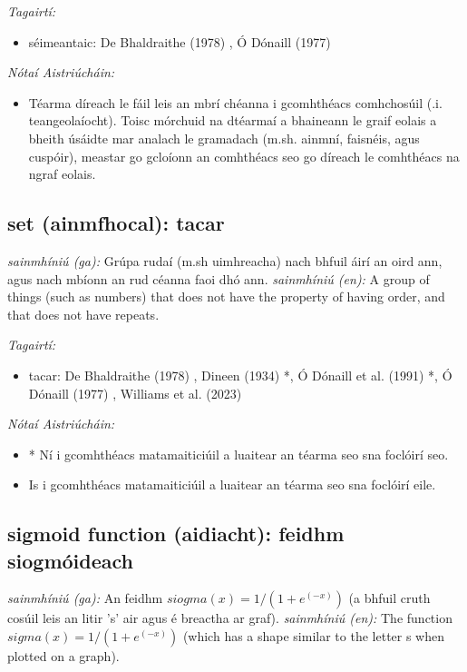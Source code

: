 \documentclass{article}
\begin{document}
 \noindent \textit{Tagairtí:}
\begin{itemize}
	\item séimeantaic: De Bhaldraithe (1978) \cite{de-bhaldraithe}, Ó Dónaill (1977) \cite{odonaill}
\end{itemize}

 \noindent \textit{Nótaí Aistriúcháin:}
\begin{itemize}
	\item Téarma díreach le fáil leis an mbrí chéanna i gcomhthéacs comhchosúil (.i. teangeolaíocht). Toisc mórchuid na dtéarmaí a bhaineann le graif eolais a bheith úsáidte mar analach le gramadach (m.sh. ainmní, faisnéis, agus cuspóir), meastar go gcloíonn an comhthéacs seo go díreach le comhthéacs na ngraf eolais.
\end{itemize}


\subsection*{set (ainmfhocal): tacar} 
 \noindent \textit{sainmhíniú (ga):} Grúpa rudaí (m.sh uimhreacha) nach bhfuil áirí an oird ann, agus nach mbíonn an rud céanna faoi dhó ann.
\newline\newline
 \noindent \textit{sainmhíniú (en):} A group of things (such as numbers) that does not have the property of having order, and that does not have repeats.
\newline

 \noindent \textit{Tagairtí:}
\begin{itemize}
	\item tacar: De Bhaldraithe (1978) \cite{de-bhaldraithe}, Dineen (1934) \cite{dineen}*, Ó Dónaill et al. (1991) \cite{focloir-beag}*, Ó Dónaill (1977) \cite{odonaill}, Williams et al. (2023) \cite{storchiste}
\end{itemize}

 \noindent \textit{Nótaí Aistriúcháin:}
\begin{itemize}
	\item * Ní i gcomhthéacs matamaiticiúil a luaitear an téarma seo sna foclóirí seo.
	\item Is i gcomhthéacs matamaiticiúil a luaitear an téarma seo sna foclóirí eile.
\end{itemize}


\subsection*{sigmoid function (aidiacht): feidhm siogmóideach} 
 \noindent \textit{sainmhíniú (ga):} An feidhm $siogma(x) = 1 / (1 + e^(-x))$ (a bhfuil cruth cosúil leis an litir 's' air agus é breactha ar graf).
\newline\newline
 \noindent \textit{sainmhíniú (en):} The function $sigma(x) = 1 / (1 + e^(-x))$ (which has a shape similar to the letter s when plotted on a graph).
\newline
\end{document}
